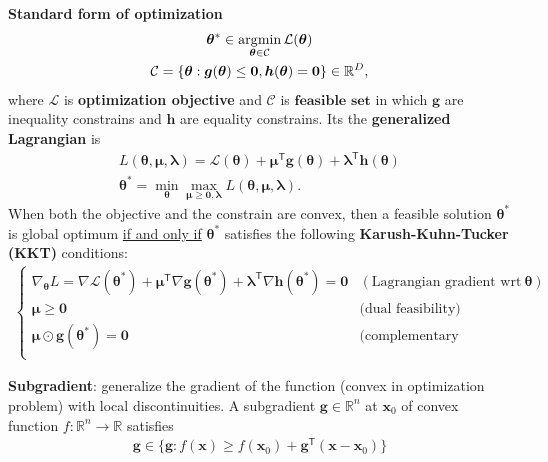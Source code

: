 \textbf{Standard form of optimization}
\begin{gather}
    \bm{\theta}^*\in\operatorname*{\arg\!min}_{\bm{\theta}\in\mathcal{C}}\mathcal{L}(\bm{\theta})\\
    \mathcal{C}=\left\{
        \bm{\theta}: \bm{g}(\bm{\theta})\leq{\bm{0}},\bm{h}(\bm{\theta})=\bm{0}
    \right\}\in\mathbb{R}^D,
\end{gather}
where $\mathcal{L}$ is \textbf{optimization objective} and $\mathcal{C}$ is $\textbf{feasible set}$ 
in which $\bm{g}$ are inequality constrains and $\bm{h}$ are equality constrains.
Its the \textbf{generalized Lagrangian} is 
\begin{gather}
    L(\bm{\theta},\bm{\mu},\bm{\lambda})
    = \mathcal{L}(\bm{\theta})+\bm{\mu}^\mathsf{T}\bm{g}(\bm{\theta})+\bm{\lambda}^\mathsf{T}\bm{h}(\bm{\theta})\\
    \bm{\theta}^*= \min_{\bm{\theta}}\max_{\bm{\mu}\geq{\bm{0}},\bm{\lambda}}L(\bm{\theta},\bm{\mu},\bm{\lambda}).
\end{gather}
When both the objective and the constrain are convex, 
then a feasible solution $\bm{\theta}^*$ is global optimum \uline{if and only if} $\bm{\theta}^*$ satisfies the following 
\textbf{Karush-Kuhn-Tucker (KKT)} conditions:
{\small\begin{gather}
    \left\{\begin{array}{ll}
        \nabla_{\bm{\theta}}{L}=\nabla\mathcal{L}(\bm{\theta}^*)+\bm{\mu}^\mathsf{T}\nabla\bm{g}(\bm{\theta}^*)+\bm{\lambda}^\mathsf{T}\nabla\bm{h}(\bm{\theta}^*)=\bm{0} 
        & (\text{Lagrangian gradient wrt}~\bm{\theta})\\
        \bm{\mu}\geq\bm{0} 
        & \text{(dual feasibility)} \\
        \bm{\mu}\odot\bm{g}(\bm{\theta}^*)=\bm{0}
        & \text{(complementary slackness)} \\
    \end{array}\right.
\end{gather}}

\textbf{Subgradient}: generalize the gradient of the function (convex in optimization problem) with local discontinuities.
A
subgradient $\bm{g}\in\mathbb{R}^n$ at $\bm{x}_0$ of convex function $f:\mathbb{R}^n\to\mathbb{R}$ satisfies
\begin{gather}
    \bm{g}\in\{\bm{g}:f(\bm{x})\geq f(\bm{x}_0)+\bm{g}^\mathsf{T}(\bm{x}-\bm{x}_0)\}
\end{gather}

